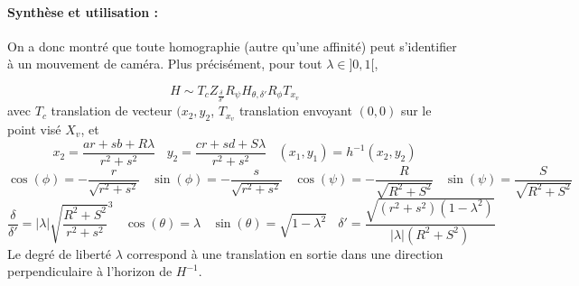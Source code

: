 %

 \paragraph{Synthèse et utilisation :}
  On a donc montré que toute homographie (autre qu'une affinité) peut s'identifier à un mouvement de caméra. Plus précisément, pour tout $\lambda \in ]0,1[$,

  \begin{equation*}
H \sim T_{c} Z_{\frac{\delta}{\delta'}}  R_{\psi}  H_{\theta,\delta'} R_{\phi}  T_{x_{v}}
  \end{equation*}
  avec $T_c$ translation de vecteur $(x_2,y_2$, $T_{x_v}$ translation envoyant $(0,0)$ sur le point visé $X_v$, et
 \begin{equation*}
x_2=\frac{ar+sb+R \lambda}{r^2 +s^2}~~~~y_2=\frac{cr+sd+S \lambda}{r^2 +s^2}~~~~(x_1 , y_1) = h^{-1}(x_{2},y_{2})
  \end{equation*}
 \begin{equation*}
 \cos( \phi )= - \frac{r}{\sqrt{r^2 + s^2}}~~~~ \sin( \phi )= - \frac{s}{\sqrt{r^2 + s^2}}~~~~\cos( \psi ) =- \frac{R}{\sqrt{R^2 + S^2}}~~~~ \sin( \psi ) = \frac{S}{\sqrt{R^2 + S^2}}
 \end{equation*}
 \begin{equation*}
 \frac{\delta}{\delta'}=|\lambda|\sqrt{\frac{R^2 + S^2}{r^2 + s^2}}^{3}~~~~\cos(\theta)=\lambda~~~~\sin(\theta)=\sqrt{1-\lambda^2}~~~~\delta'=  \frac{\sqrt{(r^2 + s^2)(1-\lambda^2)}}{|\lambda| (R^2+S^2)}
 \end{equation*}
 Le degré de liberté $\lambda$ correspond à une translation en sortie dans une direction perpendiculaire à l'horizon de $H^{-1}$.
 
